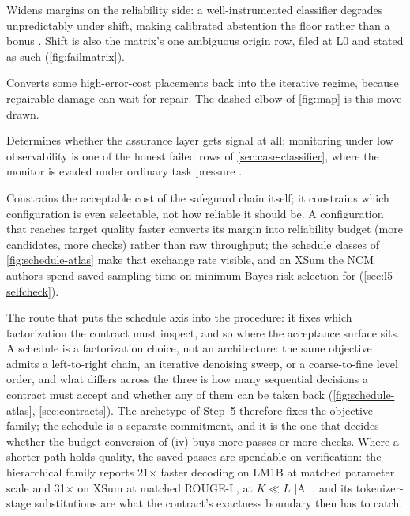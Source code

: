 \begin{description}[leftmargin=1.5em, itemsep=1pt]
\item[(i) Distribution shift.] Widens margins on the reliability side: a well-instrumented
  classifier degrades unpredictably under shift, making calibrated abstention the floor rather
  than a bonus \cite{id250315850,id221116158}. Shift is also the matrix's one ambiguous origin row,
  filed at L0 and stated as such (\cref{fig:failmatrix}).
\item[(ii) Reversibility.] Converts some high-error-cost placements back into the iterative
  regime, because repairable damage can wait for repair. The
  dashed elbow of \cref{fig:map} is this move drawn.
\item[(iii) Observability.] Determines whether the assurance layer gets signal at all; monitoring
  under low observability is one of the honest failed rows of \cref{sec:case-classifier}, where
  the monitor is evaded under ordinary task pressure \cite{id260930217}.
\item[(iv) Operational budget.] Constrains the acceptable cost of the safeguard chain itself; it
  constrains which configuration is even selectable, not how reliable it should be. A
  configuration that reaches target quality faster converts its margin into reliability budget
  (more candidates, more checks) rather than raw throughput; the schedule classes of
  \cref{fig:schedule-atlas} make that exchange rate visible, and on XSum the NCM authors spend
  saved sampling time on minimum-Bayes-risk selection for  (\cref{sec:l5-selfcheck}).
\item[(v) Schedule.] The route that puts the schedule axis into the procedure: it fixes which
  factorization the contract must inspect, and so where the acceptance surface sits. A schedule is
  a factorization choice, not an architecture: the same objective admits a left-to-right chain, an
  iterative denoising sweep, or a coarse-to-fine level order, and what differs across the three is
  how many sequential decisions a contract must accept and whether any of them can be taken back
  (\cref{fig:schedule-atlas}, \cref{sec:contracts}). The archetype of Step~5 therefore
  fixes the objective family; the schedule is a separate commitment, and it is
  the one that decides whether the budget conversion of (iv) buys more passes or more checks. Where
  a shorter path holds quality, the saved passes are spendable on verification: the hierarchical
  family reports 21$\times$ faster decoding on LM1B at matched parameter scale and 31$\times$ on
  XSum at matched ROUGE-L, at $K \ll L$ [A] \cite{kumbong2026ncm}, and its tokenizer-stage
  substitutions are what the contract's exactness boundary then has to catch.
\end{description}

